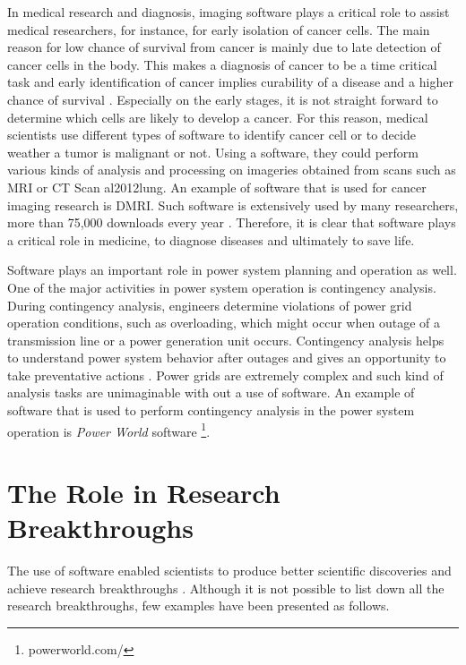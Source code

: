 In medical research and diagnosis, imaging software plays a critical role to assist medical researchers, for instance, for early isolation of cancer cells.  The main reason for low chance of survival from cancer is mainly due to late detection of cancer cells in the body. This makes a diagnosis of cancer to be a time critical task and early identification of cancer implies curability of a disease and a higher chance of survival \citep{wagner2004challenges}. Especially on the early stages, it is not straight forward to determine which cells are likely to develop a cancer. For this reason, medical scientists use different types of software to identify cancer cell or to decide weather a tumor is malignant or not. Using a software, they could perform various kinds of analysis and processing on imageries obtained from scans such as \ac{MRI} or \ac{CT} Scan {al2012lung}. An example of software that is used for cancer imaging research is DMRI. Such software is extensively used by many researchers, more than 75,000 downloads every year \citep{norton2017slicerdmri}. Therefore, it is clear that software plays a critical role in medicine, to diagnose diseases and ultimately to save life.

Software plays an important role in power system planning and operation as well. One of the major activities in power system operation is contingency analysis. During contingency analysis, engineers determine violations of power grid operation conditions, such as overloading, which might occur when outage of a transmission line or a power generation unit occurs. Contingency analysis helps to understand power system behavior after outages and gives an opportunity to take preventative actions \citep{mishra2012contingency}. Power grids are extremely complex and such kind of analysis tasks are unimaginable with out a use of software. An example of software that is used to perform contingency analysis in the power system operation is  \emph{Power World} software  \footnote{powerworld.com/}.
 

%

\section{The Role in Research Breakthroughs  }
\label{sec:background:second_section}
The use of software enabled scientists to produce better scientific discoveries and achieve research breakthroughs \citep{goble2014better}. Although it is not possible to list down all the research breakthroughs, few examples have been presented as follows.


